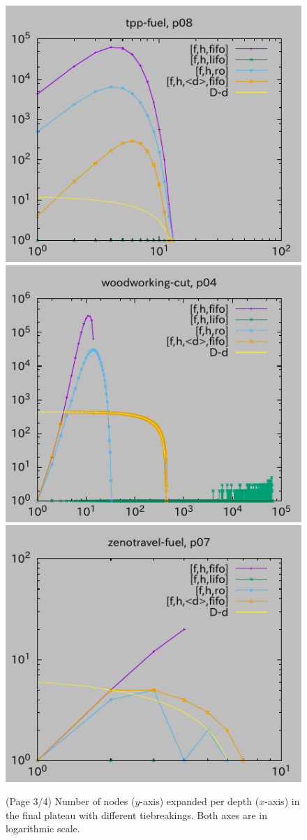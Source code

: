\begin{figure}[htbp]
\includegraphics{img/depth/tpp-fuel/p08.pdf}
\includegraphics{img/depth/woodworking-cut/p04.pdf}
\includegraphics{img/depth/zenotravel-fuel/p07.pdf}
 \caption{(Page 3/4) Number of nodes ($y$-axis) expanded per depth ($x$-axis) in
 the final plateau with different tiebreakings. Both axes are in logarithmic scale.
 }
 \label{fig:depth-histogram3}
\end{figure}

